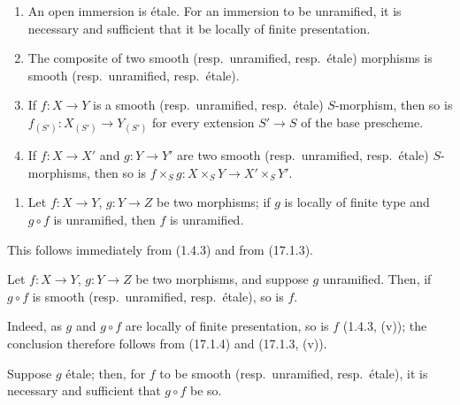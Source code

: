 \begin{proposition}[17.3.3]
\label{IV.17.3.3}
\begin{enumerate}
  \item[\textup{(i)}] An open immersion is étale. For an immersion to be unramified, it is necessary and sufficient that it be locally of finite presentation.
  \item[(ii)] The composite of two smooth \textup{(resp.}\ unramified, \textup{resp.}\ étale\textup{)} morphisms is smooth \textup{(resp.}\ unramified, \textup{resp.}\ étale\textup{)}.
  \item[\textup{(iii)}] If $f:X\to Y$ is a smooth \textup{(resp.}\ unramified, \textup{resp.}\ étale\textup{)} $S$-morphism, then so is $f_{(S')}:X_{(S')}\to Y_{(S')}$ for every extension $S'\to S$ of the base prescheme.
  \item[\textup{(iv)}] If $f:X\to X'$ and $g:Y\to Y'$ are two smooth \textup{(resp.}\ unramified, \textup{resp.}\ étale\textup{)} $S$-morphisms, then so is $f\times_S g:X\times_S Y\to X'\times_S Y'$.
\end{enumerate}


\begin{enumerate}
  \item[\textup{(v)}] Let $f:X\to Y$, $g:Y\to Z$ be two morphisms; if $g$ is locally of finite type and $g\circ f$ is unramified, then $f$ is unramified.
\end{enumerate}
\end{proposition}

This follows immediately from (1.4.3) and from (17.1.3).

\begin{proposition}[17.3.4]
\label{IV.17.3.4}
Let $f:X\to Y$, $g:Y\to Z$ be two morphisms, and suppose $g$ unramified. Then, if $g\circ f$ is smooth \textup{(resp.}\ unramified, \textup{resp.}\ étale\textup{)}, so is $f$.
\end{proposition}

Indeed, as $g$ and $g\circ f$ are locally of finite presentation, so is $f$ (1.4.3, (v)); the conclusion therefore follows from (17.1.4) and (17.1.3, (v)).

\begin{corollary}[17.3.5]
\label{IV.17.3.5}
Suppose $g$ étale; then, for $f$ to be smooth \textup{(resp.}\ unramified, \textup{resp.}\ étale\textup{)}, it is necessary and sufficient that $g\circ f$ be so.
\end{corollary}

